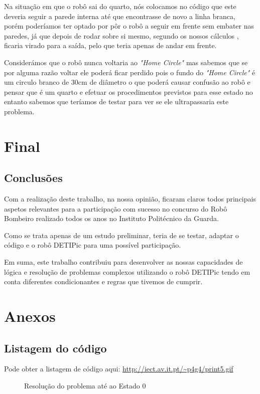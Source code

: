 \documentclass[pdftex,12pt,a4paper]{report}
\begin{document}
Na situação em que o robô sai do quarto, nós colocamos no código que este deveria seguir a parede interna até que encontrasse de novo a linha branca, porém poderíamos ter optado por pôr o robô a seguir em frente sem embater nas paredes, já que depois de rodar sobre si mesmo, segundo os nossos cálculos , ficaria virado para a saída, pelo que teria apenas de andar em frente.

Considerámos que o robô nunca voltaria ao \emph{"Home Circle"} mas sabemos que se por alguma razão voltar ele poderá ficar perdido pois o fundo do \emph{"Home Circle"} é um circulo branco de 30cm de diâmetro o que poderá causar confusão ao robô e pensar que é um quarto e efetuar os procedimentos previstos para esse estado no entanto sabemos que teríamos de testar para ver se ele ultrapassaria este problema.



\clearpage
\section{Final}

\subsection{Conclusões}
Com a realização deste trabalho, na nossa opinião, ficaram claros todos principais aspetos relevantes para a participação com sucesso no concurso do Robô Bombeiro realizado todos os anos no Instituto Politécnico da Guarda.

Como se trata apenas de um estudo preliminar, teria de se testar, adaptar o código e o robô DETIPic para uma possível participação. 

Em suma, este trabalho contribuiu para desenvolver as nossas capacidades de lógica e resolução de problemas complexos utilizando o robô DETIPic tendo em conta diferentes condicionantes e regras que tivemos de cumprir.

\clearpage
\section{Anexos}
\subsection{Listagem do código}

Pode obter a listagem de código aqui: \url{http://iect.av.it.pt/~p4g4/print5.gif}

\begin{figure}[h]
\centerline{}
\caption{Resolução do problema até ao Estado 0}\label{estado0}
\end{figure}
\end{document}
